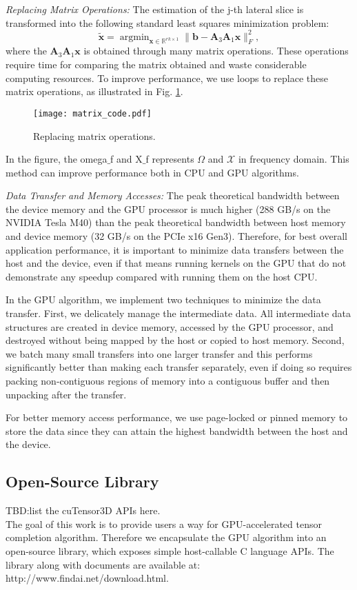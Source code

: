 \documentclass[format=acmsmall, review=false, screen=true]{acmart}
\begin{document}
\textit{Replacing Matrix Operations:}
The estimation of the j-th lateral slice is transformed into the following standard least squares minimization problem:
\[
\widetilde{\mathbf{x}} = \mathop{\arg \min}_{\mathbf{x} \in
\mathbb{R}^{rk \times 1}} \|\mathbf{b}-\mathbf{A}_3\mathbf{A}_1 \mathbf{x} \|^2_F,
\]
where the $\mathbf{A}_3\mathbf{A}_1\mathbf{x}$ is obtained through many matrix
operations. These operations require time for comparing the matrix
obtained and waste considerable computing resources. To improve performance, we use loops to replace these matrix operations, as illustrated in Fig. \ref{pic_replace_matrix}.
\begin{figure}[t]
    \centering
    \texttt{[image: matrix\_code.pdf]}
    \caption{Replacing matrix operations.}
    \label{pic_replace_matrix}
\end{figure}
In the figure, the omega$\_$f and X$\_$f represents $\Omega$ and $\mathcal{X}$ in frequency domain. This method can improve performance both in CPU and GPU algorithms.

\textit{Data Transfer and Memory Accesses:}
The peak theoretical bandwidth between the device memory and the GPU processor is much higher (288 GB/s on the NVIDIA Tesla M40) than the peak theoretical bandwidth between host memory and device memory (32 GB/s on the PCIe x16 Gen3). Therefore, for best overall application performance, it is important to minimize data transfers between the host and the device, even if that means running kernels on the GPU that do not demonstrate any speedup compared with running them on the host CPU.

In the GPU algorithm, we implement two techniques to minimize the data transfer. First, we delicately manage the intermediate data. All intermediate data structures are created in device memory, accessed by the GPU processor, and destroyed without being mapped by the host or copied to host memory. Second, we batch many small transfers into one larger transfer and this performs significantly better than making each transfer separately,  even if doing so requires packing non-contiguous regions of memory into a contiguous buffer and then unpacking after the transfer.

For better memory access performance, we use page-locked or pinned memory to store the data since they can attain the highest bandwidth between the host and the device.

\subsection{Open-Source Library}
TBD:list the cuTensor3D APIs here.\\
The goal of this work is to provide users a way for GPU-accelerated tensor completion algorithm.  Therefore we encapsulate the GPU algorithm into an open-source library, which exposes simple host-callable C language APIs. The library along with documents are available at:\\ http://www.findai.net/download.html.
\end{document}
